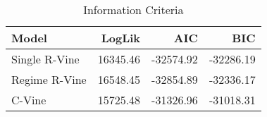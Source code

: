 \begin{table}

\caption{Information Criteria}
\centering
\begin{tabular}[t]{lrrr}
\toprule
Model & LogLik & AIC & BIC\\
\midrule
Single R-Vine & 16345.46 & -32574.92 & -32286.19\\
Regime R-Vine & 16548.45 & -32854.89 & -32336.17\\
C-Vine & 15725.48 & -31326.96 & -31018.31\\
\bottomrule
\end{tabular}
\end{table}
